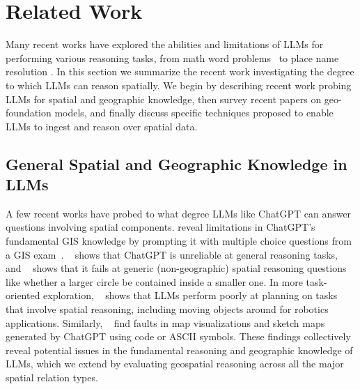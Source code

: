 \section{Related Work}
\label{section:related}
\normalsize

Many recent works have explored the abilities and limitations of LLMs for performing various reasoning tasks, from math word problems~\cite{Gao2023, Badaro2023} to place name resolution \cite{Mai2023}.
In this section we summarize the recent work investigating the degree to which LLMs can reason spatially.
We begin by describing recent work probing LLMs for spatial and geographic knowledge, then survey recent papers on geo-foundation models, and finally discuss specific techniques proposed to enable LLMs to ingest and reason over spatial data.


\subsection{General Spatial and Geographic Knowledge in LLMs}
A few recent works have probed to what degree LLMs like ChatGPT can answer questions involving spatial components.
%
\citeauthor{Mooney2023} reveal limitations in ChatGPT's fundamental GIS knowledge by prompting it with multiple choice questions from a GIS exam~\cite{Mooney2023}.
\citeauthor{Bang2023}~\cite{Bang2023} shows that ChatGPT is unreliable at general reasoning tasks, and
\citeauthor{Cohn2023}~\cite{Cohn2023} shows that it fails at generic (non-geographic) spatial reasoning questions like whether a larger circle be contained inside a smaller one.
In more task-oriented exploration, 
\citeauthor{Xie2023translating}~\cite{Xie2023translating} shows that LLMs perform poorly at planning on tasks that involve spatial reasoning, including moving objects around for robotics applications.
Similarly, 
\citeauthor{Tao2023}~\cite{Tao2023} find faults in map visualizations and sketch maps generated by ChatGPT using code or ASCII symbols.
%
These findings collectively reveal potential issues in the fundamental reasoning and geographic knowledge of LLMs, which we extend by evaluating geospatial reasoning across all the major spatial relation types.





